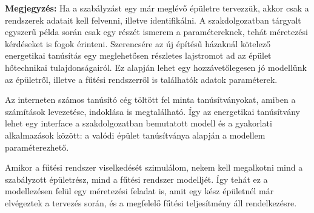 \begin{formal}
	\textbf{Megjegyzés:}
	Ha a szabályzást egy már meglévő épületre tervezzük, akkor csak a rendszerek adatait kell felvenni, illetve identifikálni. A szakdolgozatban tárgyalt egyszerű példa során csak egy részét ismerem a paramétereknek, tehát méretezési kérdéseket is fogok érinteni.  Szerencsére az új építésű házaknál kötelező energetikai tanúsítás%
 egy meglehetősen részletes lajstromot ad az épület hőtechnikai tulajdonságairól. Ez alapján lehet egy hozzávetőlegesen jó modellünk az épületről, illetve a fűtési rendszerről is találhatók adatok paraméterek.

\end{formal}



 Az interneten számos tanúsító cég töltött fel minta tanúsítványokat, amiben a számítások levezetése, indoklása is megtalálható. Így az energetikai tanúsítvány lehet egy interface a szakdolgozatban bemutatott modell és a gyakorlati alkalmazások között: a valódi épület tanúsítványa alapján a modellem paraméterezhető.


Amikor a fűtési rendszer viselkedését szimulálom, nekem kell megalkotni mind a szabályzott épületrész, mind a fűtési rendszer modelljét. Így tehát ez a modellezésen felül egy méretezési feladat is, amit egy kész épületnél már elvégeztek a tervezés során, és a megfelelő fűtési teljesítmény áll rendelkezésre. %






%
%
%




\pagebreak
